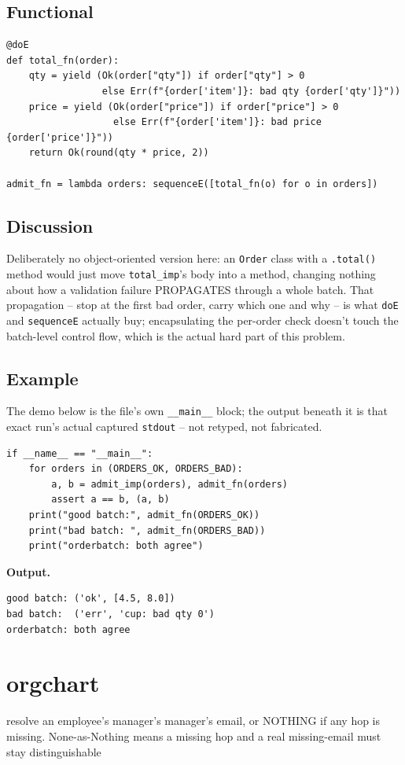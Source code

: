 \documentclass[10pt,letterpaper]{book}
\begin{document}
\section*{Functional}
\begin{lstlisting}[style=code]
@doE
def total_fn(order):
    qty = yield (Ok(order["qty"]) if order["qty"] > 0
                 else Err(f"{order['item']}: bad qty {order['qty']}"))
    price = yield (Ok(order["price"]) if order["price"] > 0
                   else Err(f"{order['item']}: bad price {order['price']}"))
    return Ok(round(qty * price, 2))

admit_fn = lambda orders: sequenceE([total_fn(o) for o in orders])
\end{lstlisting}
\section*{Discussion}

Deliberately no object-oriented version here: an \texttt{Order} class
with a \texttt{.total()} method would just move \texttt{total\_imp}'s
body into a method, changing nothing about how a validation failure
PROPAGATES through a whole batch. That propagation -- stop at the first
bad order, carry which one and why -- is what \texttt{doE} and
\texttt{sequenceE} actually buy; encapsulating the per-order check
doesn't touch the batch-level control flow, which is the actual hard
part of this problem.

\section*{Example}
The demo below is the file's own \texttt{\_\_main\_\_} block; the output beneath it is that exact run's actual captured \texttt{stdout} -- not retyped, not fabricated.
\begin{lstlisting}[style=code]
if __name__ == "__main__":
    for orders in (ORDERS_OK, ORDERS_BAD):
        a, b = admit_imp(orders), admit_fn(orders)
        assert a == b, (a, b)
    print("good batch:", admit_fn(ORDERS_OK))
    print("bad batch: ", admit_fn(ORDERS_BAD))
    print("orderbatch: both agree")
\end{lstlisting}
\noindent\textbf{Output.}
\begin{lstlisting}[style=ex]
good batch: ('ok', [4.5, 8.0])
bad batch:  ('err', 'cup: bad qty 0')
orderbatch: both agree
\end{lstlisting}
\chapter{orgchart}
resolve an employee's manager's manager's email, or NOTHING if any hop is missing. None-as-Nothing means a missing hop and a real missing-email must stay distinguishable
\end{document}
